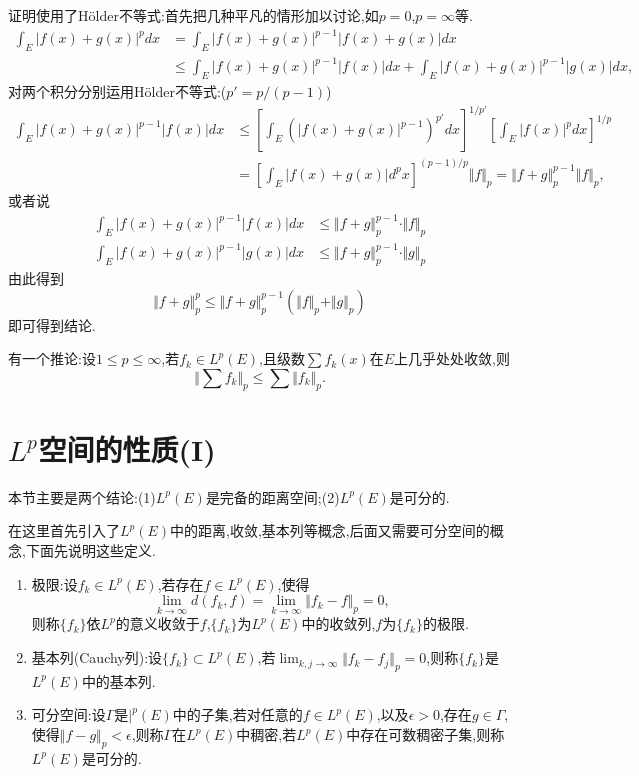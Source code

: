 \documentclass[12pt,a4paper,openany]{book}
\begin{document}
\begin{enumerate}
证明使用了H\"older不等式:首先把几种平凡的情形加以讨论,如$p=0$,$p=\infty$等.
\[
\begin{aligned}
\int_{E}{|f(x)+g(x)|^pdx} &= \int_{E}{|f(x)+g(x)|^{p-1}|f(x)+g(x)|dx} \\
&\le \int_{E}{|f(x)+g(x)|^{p-1}|f(x)|dx} + \int_{E}{|f(x)+g(x)|^{p-1}|g(x)|dx},
\end{aligned}
\]
对两个积分分别运用H\"older不等式:($p'=p/(p-1)$)
\[
\begin{aligned}
\int_{E}{|f(x)+g(x)|^{p-1}|f(x)|dx} &\le [\int_{E}{(|f(x)+g(x)|^{p-1})^{p'}dx}]^{1/p'}[\int_{E}{|f(x)|^pdx}]^{1/p} \\
&=[\int_{E}{|f(x)+g(x)|d^px}]^{(p-1)/p} \Vert{f}\Vert_p = \Vert{f+g}\Vert_{p}^{p-1}\Vert{f}\Vert_p,
\end{aligned}
\]
或者说
\[
\begin{aligned}
\int_{E}{|f(x)+g(x)|^{p-1}|f(x)|dx} &\le \Vert{f+g}\Vert_{p}^{p-1} \cdot \Vert{f}\Vert_p \\
\int_{E}{|f(x)+g(x)|^{p-1}|g(x)|dx} &\le \Vert{f+g}\Vert_{p}^{p-1} \cdot \Vert{g}\Vert_p
\end{aligned}
\]
由此得到
\[
\Vert{f+g}\Vert_{p}^{p} \le \Vert{f+g}\Vert_{p}^{p-1}(\Vert{f}\Vert_p + \Vert{g}\Vert_p)
\]
即可得到结论.

有一个推论:设$1 \le p \le \infty$,若$f_k \in L^p(E)$,且级数$\sum{f_k(x)}$在$E$上几乎处处收敛,则
\[
\Vert{\sum{f_k}}\Vert_p \le \sum{\Vert{f_k}\Vert_p}.
\]

\end{enumerate}

\section{$L^p$空间的性质(I)}
本节主要是两个结论:(1)$L^p(E)$是完备的距离空间;(2)$L^p(E)$是可分的.

在这里首先引入了$L^p(E)$中的距离,收敛,基本列等概念,后面又需要可分空间的概念,下面先说明这些定义.

\begin{enumerate}
\item 极限:设$f_k \in L^p(E)$,若存在$f \in L^p(E)$,使得
\[
\lim_{k \rightarrow \infty}{d(f_k,f)} = \lim_{k \rightarrow \infty}{\Vert{f_k - f}\Vert_p} = 0,
\]
则称$\{f_k\}$依$L^p$的意义收敛于$f$,$\{f_k\}$为$L^p(E)$中的收敛列,$f$为$\{f_k\}$的极限.

\item 基本列(Cauchy列):设$\{f_k\} \subset L^p(E)$,若$\lim_{k,j \rightarrow \infty}{\Vert{f_k - f_j}\Vert_{p}}=0$,则称$\{f_k\}$是$L^{p}(E)$中的基本列.

\item 可分空间:设$\Gamma$是$|^p(E)$中的子集,若对任意的$f \in L^p(E)$,以及$\epsilon > 0$,存在$g \in \Gamma$,使得$\Vert{f-g}\Vert_p<\epsilon$,则称$\Gamma$在$L^p(E)$中稠密,若$L^p(E)$中存在可数稠密子集,则称$L^p(E)$是可分的.
\end{enumerate}
\end{document}
